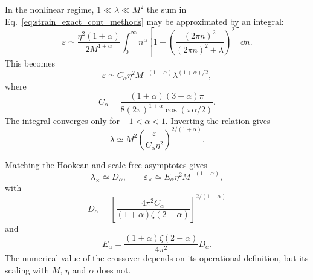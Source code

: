 \documentclass[pdflatex, twocolumn, sn-nature]{sn-jnl}
\begin{document}

In the nonlinear regime, $1\ll\lambda\ll M^2$ the sum in Eq.~\eqref{eq:strain_exact_cont_methods} may be approximated by an integral:
\begin{equation}
\varepsilon
\simeq
\frac{\eta^2(1+\alpha)}{2M^{1+\alpha}}
\int_0^\infty
n^\alpha
\left[
1-
\left(
\frac{(2\pi n)^2}
{(2\pi n)^2+\lambda}
\right)^2
\right]
\dd n .
\end{equation}
This becomes
\begin{equation}
\varepsilon
\simeq
C_\alpha
\eta^2
M^{-(1+\alpha)}
\lambda^{(1+\alpha)/2},
\end{equation}
where
\begin{equation}
C_\alpha
=
\frac{(1+\alpha)(3+\alpha)\pi}
{8(2\pi)^{1+\alpha}
\cos(\pi\alpha/2)}.
\end{equation}
The integral converges only for $-1<\alpha<1$. Inverting the relation gives
\begin{equation}
\lambda
\simeq
M^2
\left(
\frac{\varepsilon}
{C_\alpha\eta^2}
\right)^{2/(1+\alpha)}.
\end{equation}

Matching the Hookean and scale-free asymptotes gives
\begin{equation}
\lambda_\times
\simeq
D_\alpha,
\qquad
\varepsilon_\times
\simeq
E_\alpha\eta^2M^{-(1+\alpha)},
\end{equation}
with
\begin{equation}
D_\alpha
=
\left[
\frac{4\pi^2C_\alpha}
{(1+\alpha)\zeta(2-\alpha)}
\right]^{2/(1-\alpha)}
\end{equation}
and
\begin{equation}
E_\alpha
=
\frac{(1+\alpha)\zeta(2-\alpha)}
{4\pi^2}
D_\alpha .
\end{equation}
The numerical value of the crossover depends on its operational definition, but its scaling with $M$, $\eta$ and $\alpha$ does not.

\end{document}
